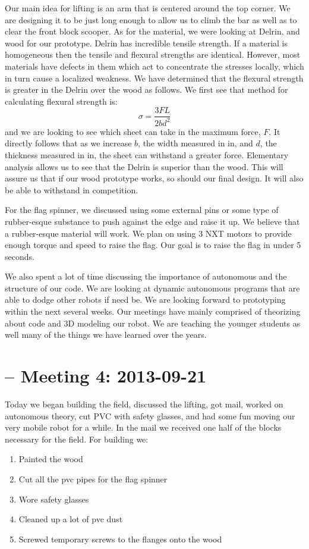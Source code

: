 \documentclass{article}
\begin{document}
Our main idea for lifting is an arm that is centered around the top corner. We are designing it to be just long enough to allow us to climb the bar as well as to clear the front block scooper. As for the material, we were looking at Delrin, and wood for our prototype. Delrin has incredible tensile strength. If a material is homogeneous then the tensile and flexural strengths are identical. However, most materials have defects in them which act to concentrate the stresses locally, which in turn cause a localized weakness. We have determined that the flexural strength is greater in the Delrin over the wood as follows. We first see that method for calculating flexural strength is: \[\sigma = \frac{3FL}{2bd^2}\] and we are looking to see which sheet can take in the maximum force, $F$. It directly follows that as we increase $b$, the width measured in in, and $d$, the  thickness measured in in, the sheet can withstand a greater force. Elementary analysis allows us to see that the Delrin is superior than the wood. This will assure us that if our wood prototype works, so should our final design. It will also be able to withstand in competition. 

For the flag spinner, we discussed using some external pins or some type of rubber-esque substance to push against the edge and raise it up. We believe that a rubber-esque material will work. We plan on using 3 NXT motors to provide enough torque and speed to raise the flag. Our goal is to raise the flag in under 5 seconds. 

We also spent a lot of time discussing the importance of autonomous and the structure of our code. We are looking at dynamic autonomous programs that are able to dodge other robots if need be. We are looking forward to prototyping within the next several weeks. Our meetings have mainly comprised of theorizing about code and 3D modeling our robot. We are teaching the younger students as well many of the things we have learned over the years. 

\newpage
\section{ -- Meeting 4: 2013-09-21}
Today we began building the field, discussed the lifting, got mail, worked on autonomous theory, cut PVC with safety glasses, and had some fun moving our very mobile robot for a while.  In the mail we received one half of the blocks necessary for the field.
For building we:
\begin{enumerate}
\item Painted the wood
\item Cut all the pvc pipes for the flag spinner
\item Wore safety glasses
\item Cleaned up a lot of pvc dust
\item Screwed temporary screws to the flanges onto the wood
\end{enumerate}
\end{document}
